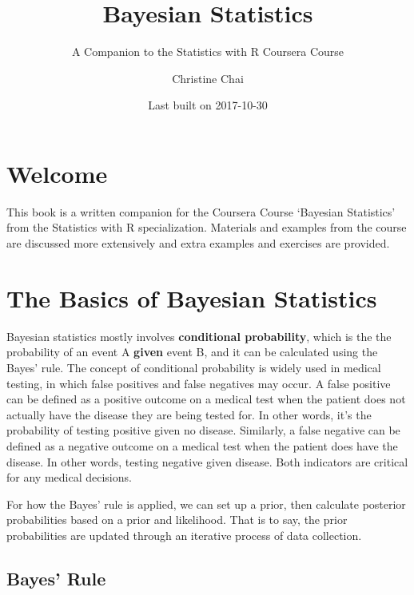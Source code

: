 \documentclass[]{book}
\title{Bayesian Statistics}
\subtitle{A Companion to the Statistics with R Coursera Course}
\author{Christine Chai}
\date{Last built on 2017-10-30}
\theoremstyle{definition}
\theoremstyle{definition}
\theoremstyle{definition}
\theoremstyle{remark}
\begin{document}
\maketitle

{
\setcounter{tocdepth}{1}
\tableofcontents
}
\chapter*{Welcome}\label{welcome}

\newcommand{\No}{\textsf{N}}
\newcommand{\Ga}{\textsf{Gamma}}
\newcommand{\St}{\textsf{t}}
\newcommand{\NoGa}{\textsf{NormalGamma}}
\renewcommand{\B}{\textsf{BF}}
\newcommand{\data}{\text{data}}
\newcommand{\iid}{\mathrel{\mathop{\sim}\limits^{\rm iid}}}


This book is a written companion for the Coursera Course `Bayesian
Statistics' from the Statistics with R specialization. Materials and
examples from the course are discussed more extensively and extra
examples and exercises are provided.

\chapter{The Basics of Bayesian
Statistics}\label{the-basics-of-bayesian-statistics}

Bayesian statistics mostly involves \textbf{conditional probability},
which is the the probability of an event A \textbf{given} event B, and
it can be calculated using the Bayes' rule. The concept of conditional
probability is widely used in medical testing, in which false positives
and false negatives may occur. A false positive can be defined as a
positive outcome on a medical test when the patient does not actually
have the disease they are being tested for. In other words, it's the
probability of testing positive given no disease. Similarly, a false
negative can be defined as a negative outcome on a medical test when the
patient does have the disease. In other words, testing negative given
disease. Both indicators are critical for any medical decisions.

For how the Bayes' rule is applied, we can set up a prior, then
calculate posterior probabilities based on a prior and likelihood. That
is to say, the prior probabilities are updated through an iterative
process of data collection.

\section{Bayes' Rule}\label{bayes-rule}
\end{document}
